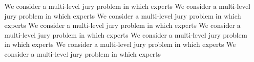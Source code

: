 \documentclass[letterpaper]{article} %
\begin{document}
We consider a multi-level jury problem in which experts
We consider a multi-level jury problem in which experts
We consider a multi-level jury problem in which experts
We consider a multi-level jury problem in which experts
We consider a multi-level jury problem in which experts
We consider a multi-level jury problem in which experts
We consider a multi-level jury problem in which experts
We consider a multi-level jury problem in which experts
\clearpage

\end{document}

